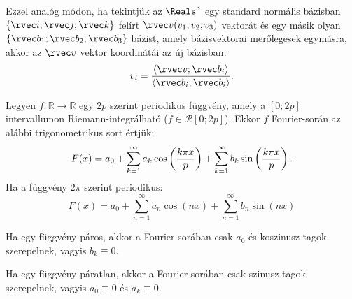 \documentclass[a4paper, 12pt]{scrartcl}
\begin{document}
\begin{note}
  Ezzel analóg módon, ha tekintjük az $\Reals^3$ egy standard normális
  bázisban $\{\rvec i; \rvec j; \rvec k\}$ felírt $\rvec v(v_1; v_2; v_3)$
  vektorát és egy másik olyan $\{\rvec b_1; \rvec b_2; \rvec b_3\}$
  bázist, amely bázisvektorai merőlegesek egymásra, akkor az $\rvec v$ vektor
  koordinátái az új bázisban:
  $$
    v_i = \frac{
      \langle \rvec v; \rvec b_i \rangle
    }{
      \langle \rvec b_i; \rvec b_i \rangle
    }
    \text.
  $$
\end{note}

\begin{definition}
  Legyen $f : \mathbb R \rightarrow \mathbb R$ egy $2p$ szerint periodikus
  függvény, amely a $[0;2p]$ intervallumon Riemann-integrálható ($f \in
    \mathcal R [0; 2p]$). Ekkor $f$ Fourier-során az alábbi trigonometrikus
  sort értjük:
  $$
    F(x)
    = a_0
    + \sum_{k = 1}^\infty a_k \cos \left( \frac{k \pi x}{p} \right)
    + \sum_{k = 1}^\infty b_k \sin \left( \frac{k \pi x}{p} \right)
    \text.
  $$
  Ha a függvény $2 \pi$ szerint periodikus:
  $$
    F(x)
    = a_0
    + \sum_{n = 1}^\infty a_n \cos (nx)
    + \sum_{n = 1}^\infty b_n \sin (nx)
  $$
\end{definition}

\begin{statement}
  Ha egy függvény páros, akkor a Fourier-sorában csak $a_0$ és koszinusz tagok
  szerepelnek, vagyis $b_k \equiv 0$.
\end{statement}

\begin{statement}
  Ha egy függvény páratlan, akkor a Fourier-sorában csak szinusz tagok
  szerepelnek, vagyis $a_0 \equiv 0$ és $a_k \equiv 0$.
\end{statement}
\end{document}
